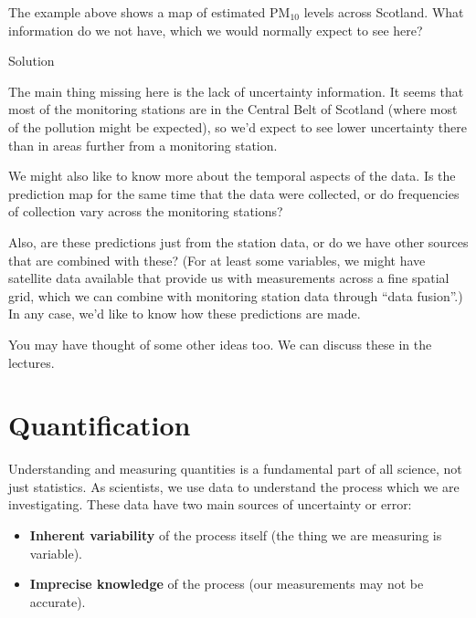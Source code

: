 \documentclass[
  letterpaper,
  DIV=11,
  numbers=noendperiod]{scrartcl}
\providecommand{\tightlist}{%
  \setlength{\itemsep}{0pt}\setlength{\parskip}{0pt}}\usepackage{longtable,booktabs,array}
\begin{document}
\begin{tcolorbox}[enhanced jigsaw, left=2mm, toprule=.15mm, rightrule=.15mm, coltitle=black, arc=.35mm, colframe=quarto-callout-tip-color-frame, breakable, bottomtitle=1mm, colback=white, titlerule=0mm, toptitle=1mm, title={Exercise}, bottomrule=.15mm, colbacktitle=quarto-callout-tip-color!10!white, opacitybacktitle=0.6, opacityback=0, leftrule=.75mm]

The example above shows a map of estimated PM\(_{10}\) levels across
Scotland. What information do we not have, which we would normally
expect to see here?

Solution

The main thing missing here is the lack of uncertainty information. It
seems that most of the monitoring stations are in the Central Belt of
Scotland (where most of the pollution might be expected), so we'd expect
to see lower uncertainty there than in areas further from a monitoring
station.

We might also like to know more about the temporal aspects of the data.
Is the prediction map for the same time that the data were collected, or
do frequencies of collection vary across the monitoring stations?

Also, are these predictions just from the station data, or do we have
other sources that are combined with these? (For at least some
variables, we might have satellite data available that provide us with
measurements across a fine spatial grid, which we can combine with
monitoring station data through ``data fusion''.) In any case, we'd like
to know how these predictions are made.

You may have thought of some other ideas too. We can discuss these in
the lectures.

\end{tcolorbox}

\section{Quantification}\label{quantification}

Understanding and measuring quantities is a fundamental part of all
science, not just statistics. As scientists, we use data to understand
the process which we are investigating. These data have two main sources
of uncertainty or error:

\begin{itemize}
\tightlist
\item
  \textbf{Inherent variability} of the process itself (the thing we are
  measuring is variable).
\item
  \textbf{Imprecise knowledge} of the process (our measurements may not
  be accurate).
\end{itemize}
\end{document}
